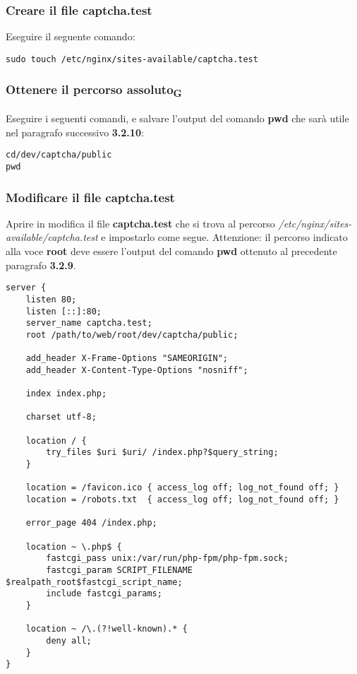 \subsubsection{Creare il file captcha.test}
Eseguire il seguente comando:
\begin{verbatim}
sudo touch /etc/nginx/sites-available/captcha.test 
\end{verbatim}

\subsubsection{Ottenere il percorso assoluto\textsubscript{G}}
Eseguire i seguenti comandi, e salvare l'output del comando \textbf{pwd} che sarà utile nel paragrafo successivo \textbf{3.2.10}:
\begin{verbatim}
cd/dev/captcha/public
pwd
\end{verbatim}

\subsubsection{Modificare il file captcha.test}
Aprire in modifica il file \textbf{captcha.test} che si trova al percorso \textit{/etc/nginx/sites-available/captcha.test } e impostarlo come segue. Attenzione: il percorso indicato alla voce \textbf{root} deve essere l'output del comando \textbf{pwd} ottenuto al precedente paragrafo \textbf{3.2.9}.
\begin{verbatim}
server {
    listen 80;
    listen [::]:80;
    server_name captcha.test;
    root /path/to/web/root/dev/captcha/public;
 
    add_header X-Frame-Options "SAMEORIGIN";
    add_header X-Content-Type-Options "nosniff";
 
    index index.php;
 
    charset utf-8;
 
    location / {
        try_files $uri $uri/ /index.php?$query_string;
    }
 
    location = /favicon.ico { access_log off; log_not_found off; }
    location = /robots.txt  { access_log off; log_not_found off; }
 
    error_page 404 /index.php;
 
    location ~ \.php$ {
        fastcgi_pass unix:/var/run/php-fpm/php-fpm.sock;
        fastcgi_param SCRIPT_FILENAME $realpath_root$fastcgi_script_name;
        include fastcgi_params;
    }
 
    location ~ /\.(?!well-known).* {
        deny all;
    }
}
\end{verbatim}

